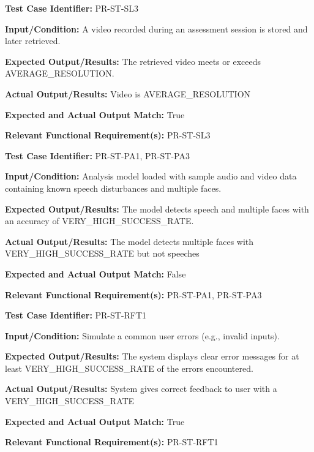 \documentclass[12pt, titlepage]{article}
\begin{document}
\begin{mdframed}[linewidth=0.5mm]
  \textbf{Test Case Identifier:} PR-ST-SL3 \par
  \textbf{Input/Condition:} A video recorded during an assessment session is stored and later retrieved. \par
  \textbf{Expected Output/Results:} The retrieved video meets or exceeds AVERAGE\_RESOLUTION. \par
  \textbf{Actual Output/Results:} Video is AVERAGE\_RESOLUTION\par
  \textbf{Expected and Actual Output Match:} True \par
  \textbf{Relevant Functional Requirement(s):} PR-ST-SL3
\end{mdframed}

\begin{mdframed}[linewidth=0.5mm]
  \textbf{Test Case Identifier:} PR-ST-PA1, PR-ST-PA3 \par
  \textbf{Input/Condition:} Analysis model loaded with sample audio and video data containing known speech disturbances and multiple faces. \par
  \textbf{Expected Output/Results:} The model detects speech and multiple faces with an accuracy of VERY\_HIGH\_SUCCESS\_RATE. \par
  \textbf{Actual Output/Results:} The model detects multiple faces with \\VERY\_HIGH\_SUCCESS\_RATE but not speeches \par
  \textbf{Expected and Actual Output Match:} False \par
  \textbf{Relevant Functional Requirement(s):} PR-ST-PA1, PR-ST-PA3
\end{mdframed}

\begin{mdframed}[linewidth=0.5mm]
  \textbf{Test Case Identifier:} PR-ST-RFT1 \par
  \textbf{Input/Condition:} Simulate a common user errors (e.g., invalid inputs). \par
  \textbf{Expected Output/Results:} The system displays clear error messages for at least VERY\_HIGH\_SUCCESS\_RATE of the errors encountered. \par
  \textbf{Actual Output/Results:} System gives correct feedback to user with a VERY\_HIGH\_SUCCESS\_RATE \par
  \textbf{Expected and Actual Output Match:} True \par
  \textbf{Relevant Functional Requirement(s):} PR-ST-RFT1
\end{mdframed}
\end{document}
